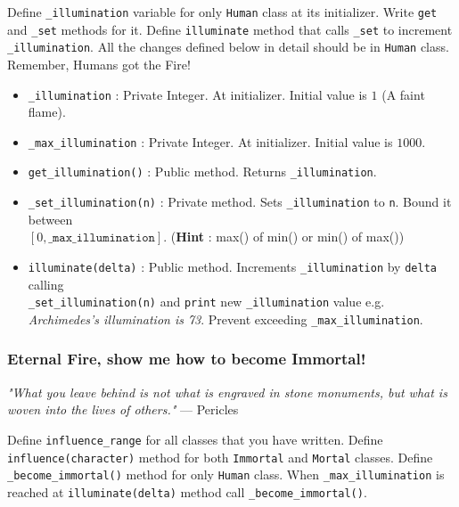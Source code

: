 \documentclass[a4paper]{article}
\begin{document}
Define \texttt{\_illumination} variable for only \texttt{Human} class at its initializer. Write \texttt{get} and \texttt{\_set} methods for it. Define \texttt{illuminate} method that calls \texttt{\_set} to increment \texttt{\_illumination}. All the changes defined below in detail should be in \texttt{Human} class. Remember, Humans got the Fire!

\begin{itemize}
    \item \texttt{\_illumination} : Private Integer. At initializer. Initial value is $1$ (A faint flame).
    \item \texttt{\_max\_illumination} : Private Integer. At initializer. Initial value is $1000$.
    \item \texttt{get\_illumination()} : Public method. Returns \texttt{\_illumination}.
    \item \texttt{\_set\_illumination(n)} : Private method. Sets \texttt{\_illumination} to \texttt{n}. Bound it between \\
          $[0, \texttt{\_max\_illumination}]$. (\textbf{Hint} : max() of min() or min() of max())
    \item \texttt{illuminate(delta)} : Public method. Increments \texttt{\_illumination} by \texttt{delta} calling\\
    \texttt{\_set\_illumination(n)} and \texttt{print} new \texttt{\_illumination} value e.g. \textit{Archimedes's illumination is 73}. Prevent exceeding \texttt{\_max\_illumination}.
\end{itemize}

\subsubsection{Eternal Fire, show me how to become Immortal!}

\textit{"What you leave behind is not what is engraved in stone monuments, but what is woven into the lives of others."} --- Pericles 

Define \texttt{influence\_range} for all classes that you have written. Define \texttt{influence(character)} method for both \texttt{Immortal} and \texttt{Mortal} classes. Define \texttt{\_become\_immortal()} method for only \texttt{Human} class. When \texttt{\_max\_illumination} is reached at \texttt{illuminate(delta)} method call \texttt{\_become\_immortal()}.
\end{document}
